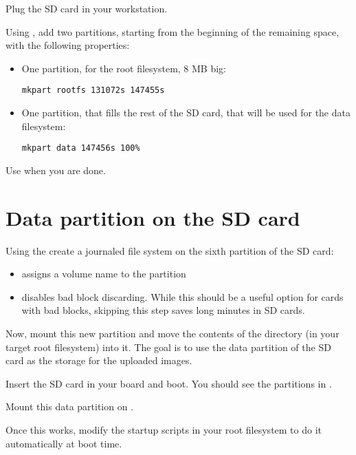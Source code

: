 Plug the SD card in your workstation.

Using , add two partitions, starting from the beginning
of the remaining space, with the following properties:
\begin{itemize}

\item One partition, for the root filesystem, 8 MB big:
\begin{verbatim}
mkpart rootfs 131072s 147455s
\end{verbatim}

\item One partition, that fills the rest of the SD card, that will be
  used for the data filesystem:
\begin{verbatim}
mkpart data 147456s 100%
\end{verbatim}
\end{itemize}

Use  when you are done.

\section{Data partition on the SD card}

Using the  create a journaled file system on the
sixth partition of the SD card:


\begin{itemize}
\item {} assigns a volume name to the partition
\item {} disables bad block discarding. While this
      should be a useful option for cards with bad blocks, skipping
      this step saves long minutes in SD cards.
\end{itemize}

Now, mount this new partition and move the contents of the
 directory (in your target root filesystem) into
it. The goal is to use the data partition of the SD card as the storage
for the uploaded images.

Insert the SD card in your board and boot. You should see the
partitions in .

Mount this data partition on .

Once this works, modify the startup scripts in your root filesystem
to do it automatically at boot time.


